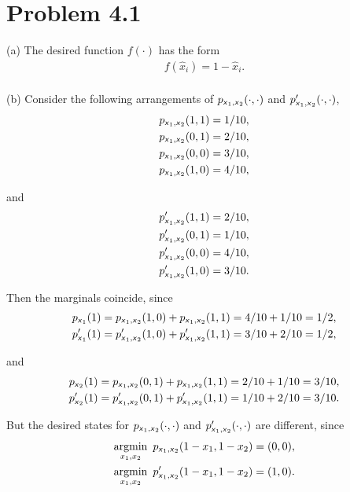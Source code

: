 \documentclass{article}
\newcommand{\s}[1]{\textsf{\textit{#1}}}
\newcommand{\qeds}{\hfill\qedsymbol}
\DeclareMathOperator*{\argmin}{argmin}
\begin{document}
\section*{Problem 4.1}
%
(a) The desired function $f(\cdot)$ has the form
\begin{align*}
	f(\hat{x}_i) = 1 - \hat{x}_i.
\end{align*}
\\

\noindent
(b)
%
Consider the following arrangements of $p_{\s{x}_1, \s{x}_2}(\cdot, \cdot)$
and $p'_{\s{x}_1, \s{x}_2}(\cdot, \cdot)$,
\begin{align*}
	p_{\s{x}_1, \s{x}_2}(1, 1) &= 1/10,\\
	p_{\s{x}_1, \s{x}_2}(0, 1) &= 2/10,\\
	p_{\s{x}_1, \s{x}_2}(0, 0) &= 3/10,\\
	p_{\s{x}_1, \s{x}_2}(1, 0) &= 4/10,
\end{align*}

and
\begin{align*}
	p'_{\s{x}_1, \s{x}_2}(1, 1) &= 2/10,\\
	p'_{\s{x}_1, \s{x}_2}(0, 1) &= 1/10,\\
	p'_{\s{x}_1, \s{x}_2}(0, 0) &= 4/10,\\
	p'_{\s{x}_1, \s{x}_2}(1, 0) &= 3/10.
\end{align*}

Then the marginals coincide, since
\begin{align*}
	p_{\s{x}_1}(1) = p_{\s{x}_1, \s{x}_2}(1, 0) + p_{\s{x}_1, \s{x}_2}(1, 1) = 4/10 + 1/10 = 1/2,\\
	p'_{\s{x}_1}(1) = p'_{\s{x}_1, \s{x}_2}(1, 0) + p'_{\s{x}_1, \s{x}_2}(1, 1) = 3/10 + 2/10 = 1/2,
\end{align*}

and
\begin{align*}
	p_{\s{x}_2}(1) = p_{\s{x}_1, \s{x}_2}(0, 1) + p_{\s{x}_1, \s{x}_2}(1, 1) = 2/10 + 1/10 = 3/10,\\
	p'_{\s{x}_2}(1) = p'_{\s{x}_1, \s{x}_2}(0, 1) + p'_{\s{x}_1, \s{x}_2}(1, 1) = 1/10 + 2/10 = 3/10.
\end{align*}

But the desired states for $p_{\s{x}_1, \s{x}_2}(\cdot, \cdot)$
and $p'_{\s{x}_1, \s{x}_2}(\cdot, \cdot)$ are different, since
\begin{align*}
	\argmin_{x_1, x_2}\ p_{\s{x}_1, \s{x}_2}(1-x_1, 1-x_2) = (0, 0),\\
	\argmin_{x_1, x_2}\ p'_{\s{x}_1, \s{x}_2}(1-x_1, 1-x_2) = (1, 0).
\end{align*}\qeds
\\
\end{document}
